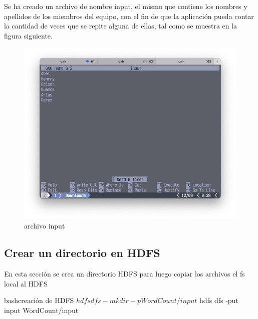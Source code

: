 Se ha creado un archivo de nombre input, el mismo que contiene los nombres y apellidos de los miembros del equipo, con el fin de que la aplicación pueda contar la cantidad de veces que se repite alguna de ellas, tal como se muestra en la figura siguiente.

\begin{figure}[h]
	\centering
	\includegraphics[scale=.35] {img/48-input}
	\caption{archivo input}
	\label{fig:48}	
\end{figure}




\subsection{Crear un directorio en HDFS}

En esta sección se crea un directorio HDFS para luego copiar los archivos el fs local al HDFS
\begin{sourcecode}[]{bash}{creación de HDFS}
$ hdfs dfs -mkdir -p WordCount/input
$ hdfs dfs -put input WordCount/input
\end{sourcecode}


